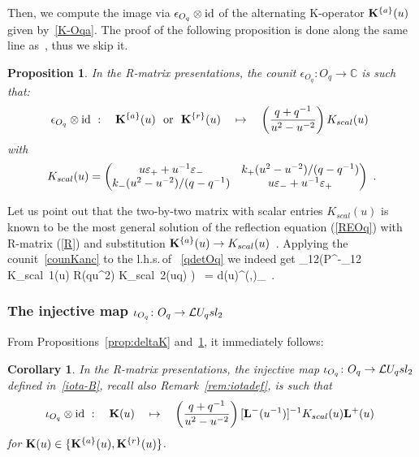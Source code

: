 \documentclass[11pt]{amsart}
\numberwithin{equation}{section}
\newtheorem{cor}[thm]{Corollary}
\newtheorem{prop}[thm]{Proposition}
\numberwithin{equation}{section}
\begin{document}
Then, we compute the image via $\epsilon_{O_q} \otimes \mathrm{id}$ of the alternating K-operator ${\bold K}^{\{a\}}(u)$ given by~\eqref{K-Oqa}.  The proof of the following proposition is done along the same line as~\cite[Prop.\,2.9]{BGL25}, thus we skip it.
\begin{prop} \label{prop:Kaq-Km}
In the R-matrix presentations, the counit $\epsilon_{O_q}:O_q \rightarrow {\mathbb C}$ is such that:
	\begin{equation}
		 \epsilon_{O_q} \otimes \id \ :\quad {\bold K}^{\{a\}}(u)\ \ \mbox{or}\ \	{\bold K}^{\{r\}}(u) \quad  \mapsto \quad  \left(\frac{q+q^{-1}}{u^2-u^{-2}}\right)K_{scal}(u) 
	\ \label{counKanc}
	\end{equation}
with
	\begin{equation}\label{KM-spin1/2}
		K_{scal}(u)=\begin{pmatrix}
			u \varepsilon_+ + u^{-1} \varepsilon_- & k_+ (u^2-u^{-2})/(q-q^{-1}) \\ 
			k_- (u^2-u^{-2})/(q-q^{-1}) & u\varepsilon_- + u^{-1} \varepsilon_+
		\end{pmatrix}\ .
	\end{equation}
\end{prop}
Let us point out that the two-by-two matrix with scalar entries $K_{scal}(u)$ is known to be  the most general solution of the reflection equation (\ref{REOq}) with R-matrix (\ref{R}) and substitution ${\bold K}^{\{a\}}(u)\rightarrow K_{scal}(u) $~\cite{GZ94,dVG}. Applying the counit~\eqref{counKanc} to the l.h.s.\,of ~\eqref{qdetOq} we indeed get
\beqa
	_{12}\big({\cal P}^{-}_{12} K_{scal\ 1}(u)  R(qu^2)  K_{scal\ 2}(uq) \big) \  = d(u)^{(\epsp,\epsm)}_{\rho}\ .\nonumber
\eeqa

\subsubsection{The injective map $\iota_{O_q}\colon O_q \rightarrow \mathcal{L} U_q sl_2$}
From Propositions~\ref{prop:deltaK} and~\ref{prop:Kaq-Km}, it immediately follows: 
\begin{cor}\label{cor:iotK}
In the R-matrix presentations, the injective map $\iota_{O_q}\colon O_q \rightarrow \mathcal{L} U_q sl_2$  
defined in~\eqref{iota-B}, recall also Remark~\ref{rem:iotadef},
is such that
\begin{equation} \label{iotK}
		\iota_{O_q} \otimes \mathrm{id} \ :\quad  {\bold K}(u) \quad \mapsto \quad \left(\frac{q+q^{-1}}{u^2-u^{-2}}\right)  \lbrack  {\bf L}^{-}(u^{-1}) \rbrack^{-1}   
	K_{scal}(u) {\bf L}^+(u)\ 
\end{equation}
for ${\bold K}(u) \in\{ {\bold K}^{\{a\}}(u),{\bold K}^{\{r\}}(u)\}$.
\end{cor}
\end{document}
